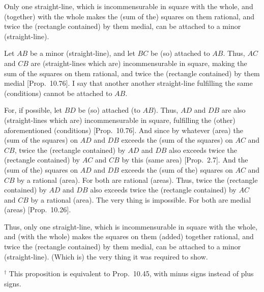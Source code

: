 \begin{Parallel}{}{}
{Only one straight-line, which is incommensurable
in square with the whole, and (together) with the whole makes the (sum of the) squares on them
rational, and twice the (rectangle contained) by them medial, can be
attached to a minor (straight-line).

\epsfysize=0.25in 
\centerline{}

Let $AB$ be a minor (straight-line), and let $BC$ be (so) attached to $AB$.
Thus, $AC$ and $CB$ are (straight-lines which are) incommensurable  in square, making the sum of
the squares on them rational, and twice the (rectangle contained) by them
medial [Prop.~10.76]. I say that another
another straight-line fulfilling the same (conditions) cannot be
attached to $AB$.

For, if possible, let $BD$ be (so) attached (to $AB$). Thus, $AD$
and $DB$ are also (straight-lines which are) incommensurable in square, fulfilling the (other) aforementioned
(conditions) [Prop.~10.76]. And since
by whatever (area) the (sum of the squares) on $AD$ and $DB$
exceeds the (sum of the squares) on $AC$ and $CB$, 
twice the (rectangle contained) by $AD$ and $DB$ also exceeds
twice the (rectangle contained) by $AC$ and $CB$  by this (same area) [Prop.~2.7]. And the (sum of the) squares on
$AD$ and $DB$ exceeds the (sum of the) squares on $AC$ and $CB$
by a rational (area). For both are rational (areas). Thus, twice the
(rectangle contained) by $AD$ and $DB$ also exceeds
twice the (rectangle contained) by $AC$ and $CB$ by a rational (area).
The very thing is impossible. For both are medial (areas) [Prop.~10.26].

Thus,  only one straight-line, which is  incommensurable in square
with the whole, and (with the whole) makes the  squares on them
(added) together rational, and twice the (rectangle contained) by them medial, can be
attached to a minor (straight-line). (Which is) the very thing it was required to
show.}
\end{Parallel}
{\footnotesize\noindent$^\dag$ This proposition is equivalent to 
Prop.~10.45, with minus signs instead of plus signs.}


